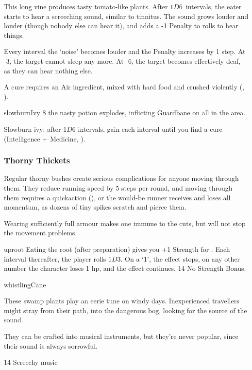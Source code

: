\begin{multicols}{2}
This long vine produces tasty tomato-like plants.
After $1D6$~\glspl{interval}, the eater starts to hear a screeching sound, similar to tinnitus.
The sound grows louder and louder (though nobody else can hear it), and adds a -1 Penalty to rolls to hear things.

Every \gls{interval} the `noise' becomes louder and the Penalty increases by 1 step.
At -3, the target cannot sleep any more.
At -6, the target becomes effectively deaf, as they can hear nothing else.

A cure requires an Air \gls{ingredient}, mixed with hard food and crushed violently (, \tn[10]).

%
  {slowburnIvy}%
  {
    }
  {}%
  {8}%
  {the nasty potion explodes, inflicting Guardbane on all in the \gls{area}.}%

Slowburn ivy: after $1D6$ \glspl{interval}, gain  each \gls{interval} until you find a cure (Intelligence + Medicine, \tn[8]). \\

\subsubsection{Thorny Thickets}
\label{thorny_thickets}

Regular thorny bushes create serious complications for anyone moving through them.
They reduce running speed by 5 \glspl{step} per round, and moving through them requires a  \gls{quickaction} (\tn[10]), or the would-be runner receives  and loses all momentum, as dozens of tiny spikes scratch and pierce them.

Wearing sufficiently full armour makes one immune to the cuts, but will not stop the movement problems.

%
  {uproot}%
  {
  Eating the root (after preparation) gives you +1 Strength for .
  Each \gls{interval} thereafter, the player rolls $1D3$.
  On a `1', the effect stops, on any other number the character loses 1 \gls{hp}, and the effect continues.
    }
{}%
{14}%
{No Strength Bonus.}%

%
  {whistlingCane}%
  {
  These swamp plants play an eerie tune on windy days.
  Inexperienced travellers might stray from their path, into the dangerous bog, looking for the source of the sound.

  They can be crafted into musical instruments, but they're never popular, since their sound is always sorrowful.
  }
{}%
{14}%
{Screechy music}%

\end{multicols}

